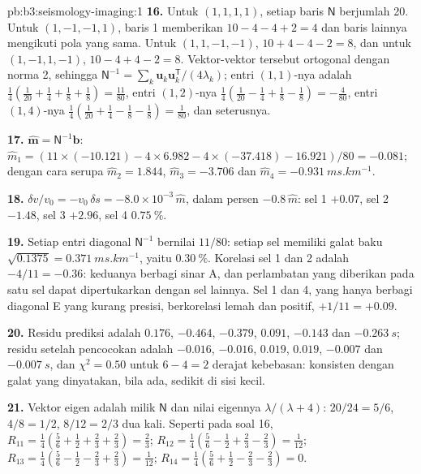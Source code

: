 \begin{solution}{pb:b3:seismology-imaging:1}
\textbf{16.} Untuk $(1,1,1,1)$, setiap baris $\mathsf N$ berjumlah 20. Untuk
$(1,-1,-1,1)$, baris 1 memberikan $10 - 4 - 4 + 2 = 4$ dan baris lainnya mengikuti
pola yang sama. Untuk $(1,1,-1,-1)$, $10 + 4 - 4 - 2 = 8$, dan untuk $(1,-1,1,-1)$,
$10 - 4 + 4 - 2 = 8$. Vektor-vektor tersebut ortogonal dengan norma 2, sehingga
$\mathsf N^{-1} = \sum_k \mathbf u_k\mathbf u_k^{\mathsf T}/(4\lambda_k)$; entri
$(1,1)$-nya adalah $\tfrac14(\tfrac1{20} + \tfrac14 + \tfrac18 + \tfrac18) =
\tfrac{11}{80}$, entri $(1,2)$-nya $\tfrac14(\tfrac1{20} - \tfrac14 + \tfrac18
- \tfrac18) = -\tfrac4{80}$, entri $(1,4)$-nya $\tfrac14(\tfrac1{20} +
\tfrac14 - \tfrac18 - \tfrac18) = \tfrac1{80}$, dan seterusnya.

\textbf{17.} $\hat{\mathbf m} = \mathsf N^{-1}\mathbf b$:
$\hat m_1 = (11\times(-10.121) - 4\times6.982 - 4\times(-37.418) - 16.921)/80
= -0.081$; dengan cara serupa $\hat m_2 = 1.844$, $\hat m_3 = -3.706$ dan
$\hat m_4 = \qty{-0.931}{ms.km^{-1}}$.

\textbf{18.} $\delta v/v_0 = -v_0\,\delta s = -8.0\times10^{-3}\,\hat m$, dalam persen
$-0.8\,\hat m$: sel 1 $+0.07$, sel 2 $-1.48$, sel 3 $+2.96$, sel 4
$\qty{+0.75}{\percent}$.

\textbf{19.} Setiap entri diagonal $\mathsf N^{-1}$ bernilai $11/80$: setiap sel
memiliki galat baku $\sqrt{0.1375} = \qty{0.371}{ms.km^{-1}}$, yaitu
$\qty{0.30}{\percent}$. Korelasi sel 1 dan 2 adalah $-4/11 = -0.36$:
keduanya berbagi sinar A, dan perlambatan yang diberikan pada satu sel dapat
dipertukarkan dengan sel lainnya. Sel 1 dan 4, yang hanya berbagi diagonal E
yang kurang presisi, berkorelasi lemah dan positif, $+1/11 = +0.09$.

\textbf{20.} Residu prediksi adalah $0.176$, $-0.464$, $-0.379$, $0.091$,
$-0.143$ dan $\qty{-0.263}{s}$; residu setelah pencocokan adalah $-0.016$,
$-0.016$, $0.019$, $0.019$, $-0.007$ dan $\qty{-0.007}{s}$, dan
$\chi^2 = 0.50$ untuk $6 - 4 = 2$ derajat kebebasan: konsisten dengan galat
yang dinyatakan, bila ada, sedikit di sisi kecil.

\textbf{21.} Vektor eigen adalah milik $\mathsf N$ dan nilai eigennya
$\lambda/(\lambda + 4)$: $20/24 = 5/6$, $4/8 = 1/2$, $8/12 = 2/3$ dua kali. Seperti
pada soal 16, $R_{11} = \tfrac14(\tfrac56 + \tfrac12 + \tfrac23 + \tfrac23) =
\tfrac23$; $R_{12} = \tfrac14(\tfrac56 - \tfrac12 + \tfrac23 - \tfrac23) =
\tfrac1{12}$; $R_{13} = \tfrac14(\tfrac56 - \tfrac12 - \tfrac23 + \tfrac23) =
\tfrac1{12}$; $R_{14} = \tfrac14(\tfrac56 + \tfrac12 - \tfrac23 - \tfrac23) = 0$.


\end{solution}
